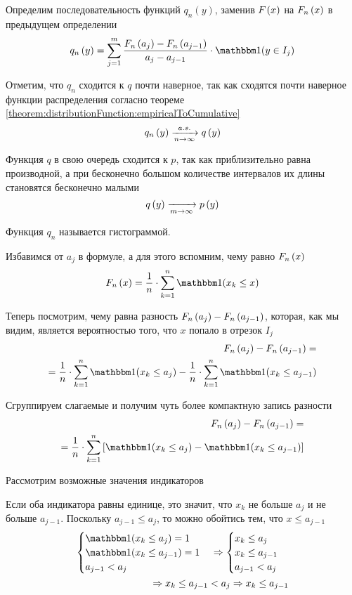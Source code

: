 Определим последовательность функций $q_n\left(y\right)$,
заменив $F_{}\left(x\right)$ на $F_n\left(x\right)$ в предыдущем определении
\begin{equation}\label{eq:histogram_start}
q_n\left(y\right)
=\sum_{j=1}^m \frac{\cdfn{a_j}-\cdfn{a_{j-1}}}{a_j-a_{j-1}}
  \cdot\indicator{y\in I_j}
\end{equation}

Отметим, что $q_n$ сходится к $q$ почти наверное, так как сходятся почти
наверное функции распределения согласно теореме
\ref{theorem:distributionFunction:empiricalToCumulative}
$$q_n\left(y\right)\xrightarrow[n\to\infty]{a.s.} q\left(y\right)$$

Функция $q$ в свою очередь сходится к $p$, так как приблизительно равна
производной, а при бесконечно большом количестве интервалов их длины
становятся бесконечно малыми
$$q\left(y\right)\xrightarrow[m\to\infty]{}p\left(y\right)$$

Функция $q_n$ называется гистограммой.

Избавимся от $a_j$ в формуле, а для этого вспомним, чему равно $F_n\left(x\right)$
$$\cdfn{x}=\frac{1}{n}\cdot \sum_{k=1}^n
\indicator{x_k\le x}$$

Теперь посмотрим, чему равна разность $F_n\left(a_j\right)-F_n\left(a_{j-1}\right)$,
которая, как мы видим, является вероятностью того,
что $x$ попало в отрезок $I_j$
\begin{align*}
  \cdfn{a_j}-\cdfn{a_{j-1}}=\\
  =\frac{1}{n}\cdot \sum_{k=1}^n
    \indicator{x_k\le a_j}-\frac{1}{n}\cdot \sum_{k=1}^n
    \indicator{x_k\le a_{j-1}}
\end{align*}

Сгруппируем слагаемые и получим чуть более компактную запись разности
\begin{eqnarray}\label{eq:cdfn_difference}
  \cdfn{a_j}-\cdfn{a_{j-1}}=\nonumber\\
  =\frac{1}{n}\cdot \sum_{k=1}^n
    \left[\indicator{x_k\le a_j}-\indicator{x_k\le a_{j-1}}\right]
\end{eqnarray}

Рассмотрим возможные значения индикаторов

Если оба индикатора равны единице,
это значит, что $x_k$ не больше $a_j$ и не больше $a_{j-1}$.
Поскольку $a_{j-1}\le a_j$, то можно обойтись тем, что $x\le a_{j-1}$
\begin{align*}
  \begin{cases}
    \indicator{x_k\le a_j}=1\\
    \indicator{x_k\le a_{j-1}}=1\\
    a_{j-1} < a_j
  \end{cases}
  \Rightarrow
  \begin{cases}
    x_k\le a_j\\
    x_k\le a_{j-1}\\
    a_{j-1} < a_j
  \end{cases}
  \\\Rightarrow
    x_k\le a_{j-1} < a_j
  \Rightarrow
    x_k\le a_{j-1}
\end{align*}

